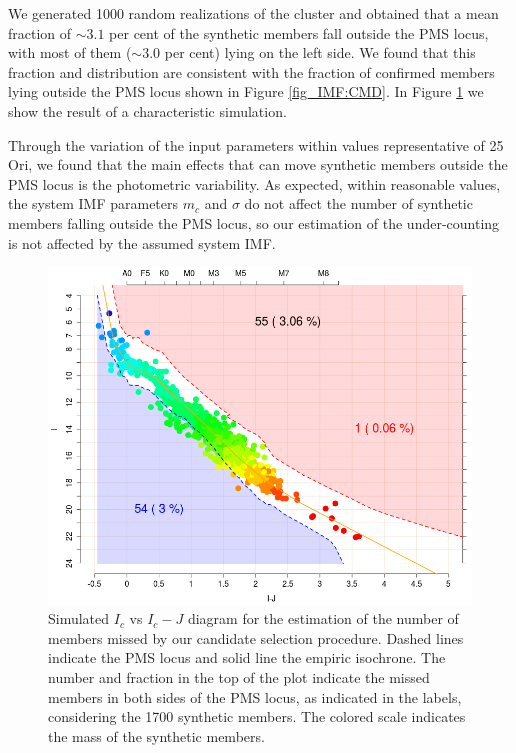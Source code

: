 \documentclass[12pt]{article}
\begin{document}
We generated 1000 random realizations of the cluster and obtained that a mean fraction of $\sim3.1$ per cent of the synthetic members fall outside the PMS locus, with most of them ($\sim3.0$ per cent) lying on the left side. We found that this fraction and distribution are consistent with the fraction of confirmed members lying outside the PMS locus shown in Figure \ref{fig_IMF:CMD}. In Figure \ref{fig_IMF:syntheticIvsIJ} we show the result of a characteristic simulation.

Through the variation of the input parameters within values representative of 25 Ori, we found that the main effects that can move synthetic members outside the PMS locus is the photometric variability. As expected, within reasonable values, the system IMF parameters $m_c$ and $\sigma$ do not affect the number of synthetic members falling outside the PMS locus, so our estimation of the under-counting is not affected by the assumed system IMF.

\begin{figure}
	\begin{minipage}{0.60\textwidth}
		\includegraphics[width=1.00\textwidth]{CMD_simulator.png}
	\end{minipage} \hfill
	\begin{minipage}{0.35\textwidth}
		\caption[Simulated $I_c$ vs $I_c-J$ diagram to estimate missed members in our sample.]{Simulated $I_c$ vs $I_c-J$ diagram for the estimation of the number of members missed by our candidate selection procedure. Dashed lines indicate the PMS locus and solid line the empiric isochrone. The number and fraction in the top of the plot indicate the missed members in both sides of the PMS locus, as indicated in the labels, considering the 1700 synthetic members. The colored scale indicates the mass of the synthetic members.
		\label{fig_IMF:syntheticIvsIJ}}
	\end{minipage}
\end{figure}
\end{document}
